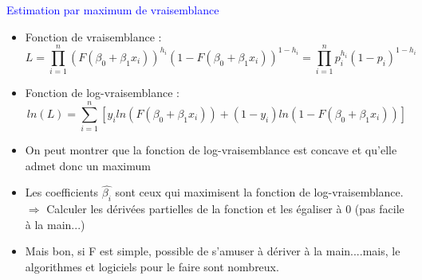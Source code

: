 \documentclass[12pt,aspectratio=1610]{beamer}
\begin{document}
\begin{frame}
	
	\textcolor{blue}{Estimation par maximum de vraisemblance}
	\begin{itemize}

		\item   Fonction de vraisemblance :     $$L=\prod_{i=1}^{n} \left( F(\beta_0+\beta_1x_i)\right)^{h_i} \left(1- F(\beta_0+\beta_1x_i)\right)^{1-h_i} = \prod_{i=1}^{n}p_i^{h_i}(1-p_i)^{1-h_i}$$
		
		\item   
		Fonction de log-vraisemblance :   
		$$ln(L)=\sum_{i=1}^{n}\left[y_iln\left(F(\beta_0+\beta_1x_i)\right)+(1-y_i)ln\left(1- F(\beta_0+\beta_1x_i)  \right) \right]$$ 
		
		
		\pause
		
		
		\pause
		
		\item On peut montrer que la fonction de log-vraisemblance est concave et qu'elle admet donc un maximum
		
		\pause
		
		\item Les coefficients $\widehat{\beta_i}$ sont ceux qui maximisent la fonction de log-vraisemblance. $\Rightarrow$ Calculer les dérivées partielles de la fonction et les égaliser à 0 (pas facile à la main...)
		
		\pause
		\item Mais bon, si F est simple, possible de s'amuser à dériver à la main....mais, le algorithmes et logiciels pour le faire sont nombreux.
	\end{itemize}
	
	
\end{frame}
\end{document}
